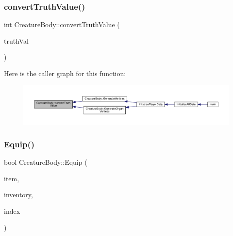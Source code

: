 \mbox{\label{class_creature_body_a2e5f101eb4ce889f47810e8e65164d50}} 
\subsubsection{\texorpdfstring{convert\+Truth\+Value()}{convertTruthValue()}}
{\footnotesize\ttfamily int Creature\+Body\+::convert\+Truth\+Value (\begin{DoxyParamCaption}\item[{std\+::string}]{truth\+Val }\end{DoxyParamCaption})}

Here is the caller graph for this function\+:
\nopagebreak
\begin{figure}[H]
\begin{center}
\leavevmode
\includegraphics[width=350pt]{da/d7d/class_creature_body_a2e5f101eb4ce889f47810e8e65164d50_icgraph}
\end{center}
\end{figure}
\mbox{\label{class_creature_body_a8a55f2c0785aaf956cdee04a538dfb97}} 
\subsubsection{\texorpdfstring{Equip()}{Equip()}}
{\footnotesize\ttfamily bool Creature\+Body\+::\+Equip (\begin{DoxyParamCaption}\item[{std\+::unique\+\_\+ptr$<$ \mbox{\hyperlink{class_item}{Item}} $>$}]{item,  }\item[{\mbox{\hyperlink{class_item_manager}{Item\+Manager}} \&}]{inventory,  }\item[{int}]{index }\end{DoxyParamCaption})}

